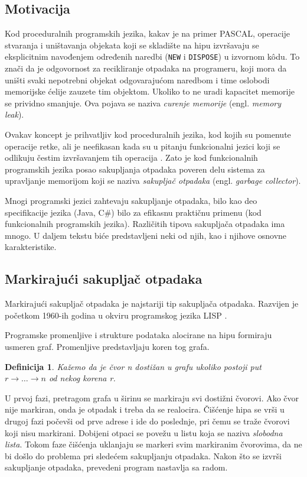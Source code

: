 \documentclass[a4paper]{article}
\newtheorem{definicija}[primer]{Definicija}
\begin{document}
\subsection{Motivacija}

Kod proceduralnih programskih jezika, kakav je na primer PASCAL, operacije stvaranja i uništavanja objekata koji se skladište na hipu izvršavaju se eksplicitnim navođenjem određenih naredbi (\verb|NEW| i \verb|DISPOSE|) u izvornom k\^odu. To znači da je odgovornost za recikliranje otpadaka na programeru, koji mora da uništi svaki nepotrebni objekat odgovarajućom naredbom i time oslobodi memorijske ćelije zauzete tim objektom. Ukoliko to ne uradi kapacitet memorije se prividno smanjuje. Ova pojava se naziva \textit{curenje memorije} (engl. \textit{memory leak}).

Ovakav koncept je prihvatljiv kod proceduralnih jezika, kod kojih su pomenute operacije retke, ali je neefikasan kada su u pitanju funkcionalni jezici koji se odlikuju čestim izvršavanjem tih operacija \cite{appel}. Zato je kod funkcionalnih programskih jezika posao sakupljanja otpadaka poveren delu sistema za upravljanje memorijom koji se naziva \textit{sakupljač otpadaka} (engl. \textit{garbage collector}).

Mnogi programski jezici zahtevaju sakupljanje otpadaka, bilo kao deo specifikacije jezika (Java, C\#) bilo za efikasnu praktičnu primenu (kod funkcionalnih programskih jezika). Različitih tipova sakupljača otpadaka ima mnogo. U daljem tekstu biće predstavljeni neki od njih, kao i njihove osnovne karakteristike.


\subsection{Markirajući sakupljač otpadaka}

Markirajući sakupljač otpadaka je najstariji tip sakupljača otpadaka. Razvijen je početkom 1960-ih godina u okviru programskog jezika LISP \cite{mcca60}.

Programske promenljive i strukture podataka alocirane na hipu formiraju usmeren graf. Promenljive predstavljaju koren tog grafa.

\begin{definicija}
	Kažemo da je čvor \textit{n} \textit{dostižan} u grafu ukoliko postoji put $r\rightarrow \dots \rightarrow n$ od nekog korena \textit{r}.
\end{definicija}

U prvoj fazi, pretragom grafa u širinu se markiraju svi dostižni čvorovi. Ako čvor nije markiran, onda je otpadak i treba da se realocira. Čišćenje hipa se vrši u drugoj fazi počevši od prve adrese i ide do poslednje, pri čemu se traže čvorovi koji nisu markirani. Dobijeni otpaci se povežu u listu koja se naziva \textit{slobodna lista}. Tokom faze čišćenja uklanjaju se markeri svim markiranim čvorovima, da ne bi došlo do problema pri sledećem sakupljanju otpadaka. Nakon što se izvrši sakupljanje otpadaka, prevedeni program nastavlja sa radom.
\end{document}
